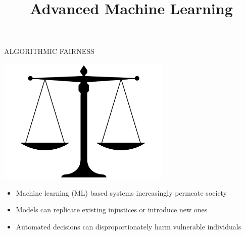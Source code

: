 \documentclass[11pt,compress,t,notes=noshow, xcolor=table]{beamer}
\title{Advanced Machine Learning}
\date{}
\begin{document}



\begin{vbframe}{ALGORITHMIC FAIRNESS}
 \begin{center}
 \vspace{-0.5cm}
 \includegraphics[width=0.62\textwidth]{figures/scale.png}
 \end{center}

 \begin{itemize}
  \item Machine learning (ML) based systems increasingly permeate society
  \item Models can replicate existing injustices or introduce new ones
  \item Automated decisions can disproportionately harm vulnerable individuals
 \end{itemize}
\end{vbframe}
\end{document}
